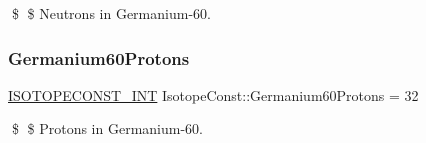 \$ \$ Neutrons in Germanium-\/60. \mbox{\label{group___isotope_const-_germanium-_ge60_gacdea4e760f43eecbcb05d83e3db618e2}} 
\subsubsection{\texorpdfstring{Germanium60\+Protons}{Germanium60Protons}}
{\footnotesize\ttfamily \mbox{\hyperlink{group___isotope_const-_macros_ga5f18360b3e99483a35c32d789e62621c}{I\+S\+O\+T\+O\+P\+E\+C\+O\+N\+S\+T\+\_\+\+I\+NT}} Isotope\+Const\+::\+Germanium60\+Protons = 32}

\$ \$ Protons in Germanium-\/60. 